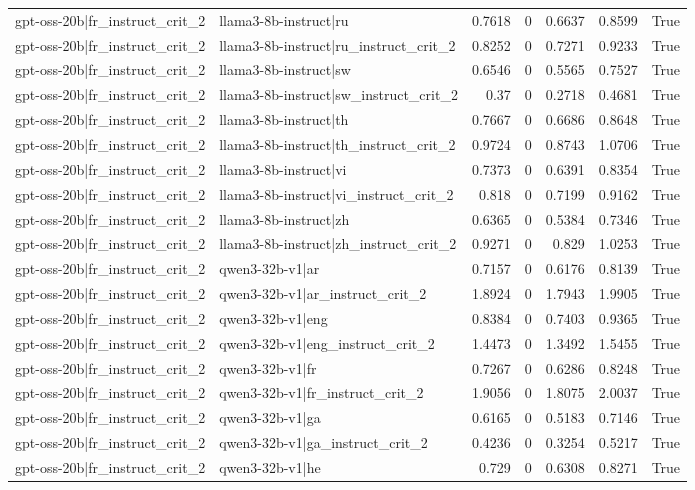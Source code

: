 \begin{table}
\begin{tabular}{l l r r r r l}
gpt-oss-20b|fr_instruct_crit_2 & llama3-8b-instruct|ru & 0.7618 & 0 & 0.6637 & 0.8599 & True \\
gpt-oss-20b|fr_instruct_crit_2 & llama3-8b-instruct|ru_instruct_crit_2 & 0.8252 & 0 & 0.7271 & 0.9233 & True \\
gpt-oss-20b|fr_instruct_crit_2 & llama3-8b-instruct|sw & 0.6546 & 0 & 0.5565 & 0.7527 & True \\
gpt-oss-20b|fr_instruct_crit_2 & llama3-8b-instruct|sw_instruct_crit_2 & 0.37 & 0 & 0.2718 & 0.4681 & True \\
gpt-oss-20b|fr_instruct_crit_2 & llama3-8b-instruct|th & 0.7667 & 0 & 0.6686 & 0.8648 & True \\
gpt-oss-20b|fr_instruct_crit_2 & llama3-8b-instruct|th_instruct_crit_2 & 0.9724 & 0 & 0.8743 & 1.0706 & True \\
gpt-oss-20b|fr_instruct_crit_2 & llama3-8b-instruct|vi & 0.7373 & 0 & 0.6391 & 0.8354 & True \\
gpt-oss-20b|fr_instruct_crit_2 & llama3-8b-instruct|vi_instruct_crit_2 & 0.818 & 0 & 0.7199 & 0.9162 & True \\
gpt-oss-20b|fr_instruct_crit_2 & llama3-8b-instruct|zh & 0.6365 & 0 & 0.5384 & 0.7346 & True \\
gpt-oss-20b|fr_instruct_crit_2 & llama3-8b-instruct|zh_instruct_crit_2 & 0.9271 & 0 & 0.829 & 1.0253 & True \\
gpt-oss-20b|fr_instruct_crit_2 & qwen3-32b-v1|ar & 0.7157 & 0 & 0.6176 & 0.8139 & True \\
gpt-oss-20b|fr_instruct_crit_2 & qwen3-32b-v1|ar_instruct_crit_2 & 1.8924 & 0 & 1.7943 & 1.9905 & True \\
gpt-oss-20b|fr_instruct_crit_2 & qwen3-32b-v1|eng & 0.8384 & 0 & 0.7403 & 0.9365 & True \\
gpt-oss-20b|fr_instruct_crit_2 & qwen3-32b-v1|eng_instruct_crit_2 & 1.4473 & 0 & 1.3492 & 1.5455 & True \\
gpt-oss-20b|fr_instruct_crit_2 & qwen3-32b-v1|fr & 0.7267 & 0 & 0.6286 & 0.8248 & True \\
gpt-oss-20b|fr_instruct_crit_2 & qwen3-32b-v1|fr_instruct_crit_2 & 1.9056 & 0 & 1.8075 & 2.0037 & True \\
gpt-oss-20b|fr_instruct_crit_2 & qwen3-32b-v1|ga & 0.6165 & 0 & 0.5183 & 0.7146 & True \\
gpt-oss-20b|fr_instruct_crit_2 & qwen3-32b-v1|ga_instruct_crit_2 & 0.4236 & 0 & 0.3254 & 0.5217 & True \\
gpt-oss-20b|fr_instruct_crit_2 & qwen3-32b-v1|he & 0.729 & 0 & 0.6308 & 0.8271 & True \\

\end{tabular}
\end{table}
